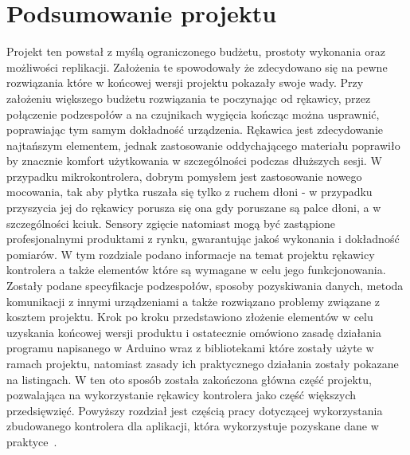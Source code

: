 \section{Podsumowanie projektu}
\label{sec:summary}
Projekt ten powstał z myślą ograniczonego budżetu, prostoty wykonania oraz możliwości replikacji. Założenia te spowodowały że zdecydowano się na pewne rozwiązania które w końcowej wersji projektu pokazały swoje wady. Przy założeniu większego budżetu rozwiązania te poczynając od rękawicy, przez połączenie podzespołów a na czujnikach wygięcia kończąc można usprawnić, poprawiając tym samym dokładność urządzenia. Rękawica jest zdecydowanie najtańszym elementem, jednak zastosowanie oddychającego materiału poprawiło by znacznie komfort użytkowania w szczególności podczas dłuższych sesji. W przypadku mikrokontrolera, dobrym pomysłem jest zastosowanie nowego mocowania, tak aby płytka ruszała się tylko z ruchem dłoni - w przypadku przyszycia jej do rękawicy porusza się ona gdy poruszane są palce dłoni, a w szczególności kciuk. Sensory zgięcie natomiast mogą być zastąpione profesjonalnymi produktami z rynku, gwarantując jakoś wykonania i dokładność pomiarów. W tym rozdziale podano informacje na temat projektu rękawicy kontrolera a także elementów które są wymagane w celu jego funkcjonowania. Zostały podane specyfikacje podzespołów, sposoby pozyskiwania danych, metoda komunikacji z innymi urządzeniami a także rozwiązano problemy związane z kosztem projektu. Krok po kroku przedstawiono złożenie elementów w celu uzyskania końcowej wersji produktu i ostatecznie omówiono zasadę działania programu napisanego w Arduino wraz z bibliotekami które zostały użyte w ramach projektu, natomiast zasady ich praktycznego działania zostały pokazane na listingach. W ten oto sposób została zakończona główna część projektu, pozwalająca na wykorzystanie rękawicy kontrolera jako część większych przedsięwzięć. Powyższy rozdział jest częścią pracy dotyczącej wykorzystania zbudowanego kontrolera dla aplikacji, która wykorzystuje pozyskane dane w praktyce~\cite{H}. 